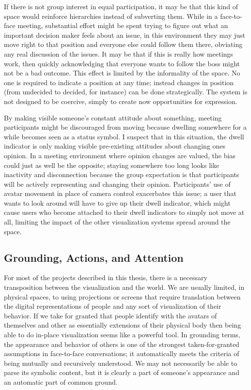 If there is not group interest in equal participation, it may be that this kind of space would reinforce hierarchies instead of subverting them. While in a face-to-face meeting, substantial effort might be spent trying to figure out what an important decision maker feels about an issue, in this environment they may just move right to that position and everyone else could follow them there, obviating any real discussion of the issues. It may be that if this is really how meetings work, then quickly acknowledging that everyone wants to follow the boss might not be a bad outcome. This effect is limited by the informality of the space. No one is required to indicate a position at any time; instead changes in position (from undecided to decided, for instance) can be done strategically. The system is not designed to be coercive, simply to create now opportunities for expression. 

By making visible someone's constant attitude about something, meeting participants might be discouraged from moving because dwelling somewhere for a while becomes seen as a status symbol. I suspect that in this situation, the dwell indicator is only making visible pre-existing attitudes about changing ones opinion. In a meeting environment where opinion changes are valued, the bias could just as well be the opposite; staying somewhere too long looks like inactivity and disconnection because the group expectation is that participants will be actively representing and changing their opinion. Participants' use of avatar movement in place of camera control exacerbates this issue; a user that wants to look around will have to give up their dwell indicator, which might cause users who become attached to their dwell indicators to simply not move at all, limiting the impact of the other visualization systems spread around the space. 

\subsection{Grounding, Actions, and Attention}

For most of the projects described in this thesis, there is a necessary transposition between the visualization and the world. We are usually limited, in physical spaces, to using projections or screens that require translation between the digital representations of people and any sort of visualization of their behavior. If we take for granted that people identify with the avatars of themselves and other as essentially extensions of their physical body  then being able to do in-place visualization seems like a powerful tool. In grounding terms, the appearance and behavior of others is one of the strongest taken-for-granted assumptions in face-to-face conversations; it automatically meets the criteria of being mutually and recursively understood. We may not necessarily be able to parse its symbolic content, but it is clearly a part of someone's appearance and an automatic part of common ground. 

